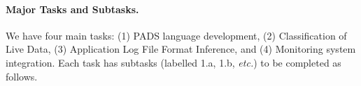 % 
% 

\paragraph*{Major Tasks and Subtasks.}
We have four main tasks: (1) PADS language development, 
(2) Classification of Live Data, (3) Application Log File Format Inference,
and (4) Monitoring system integration.  Each task has subtasks
(labelled 1.a, 1.b, {\em etc.}) to be completed as follows.

